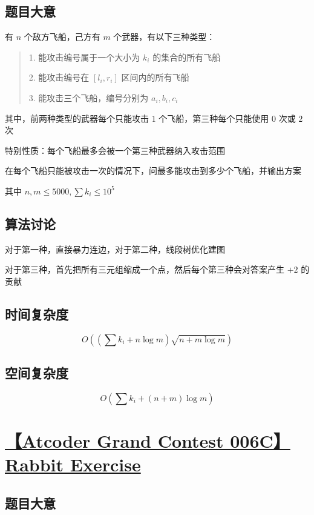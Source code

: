 \documentclass[UTF8]{article}
\begin{document}
\subsection{题目大意}

有 $n$ 个敌方飞船，己方有 $m$ 个武器，有以下三种类型：

\begin{quotation}

1. 能攻击编号属于一个大小为 $k_i$ 的集合的所有飞船

2. 能攻击编号在 $[l_i,r_i]$ 区间内的所有飞船

3. 能攻击三个飞船，编号分别为 $a_i, b_i, c_i$

\end{quotation}

其中，前两种类型的武器每个只能攻击 $1$ 个飞船，第三种每个只能使用 $0$ 次或 $2$ 次

特别性质：每个飞船最多会被一个第三种武器纳入攻击范围

在每个飞船只能被攻击一次的情况下，问最多能攻击到多少个飞船，并输出方案

其中 $n,m \le 5000, \sum k_i \le 10^5$

\subsection{算法讨论}

对于第一种，直接暴力连边，对于第二种，线段树优化建图

对于第三种，首先把所有三元组缩成一个点，然后每个第三种会对答案产生 $+2$ 的贡献

\subsection{时间复杂度}

$$
O((\sum k_i + n \log m) \sqrt {n+m \log m})
$$

\subsection{空间复杂度}

$$
O(\sum k_i + (n + m) \log m)
$$

\section{\href{https://atcoder.jp/contests/agc006/tasks/agc006_c}{【Atcoder Grand Contest 006C】Rabbit Exercise}}

\subsection{题目大意}
\end{document}
